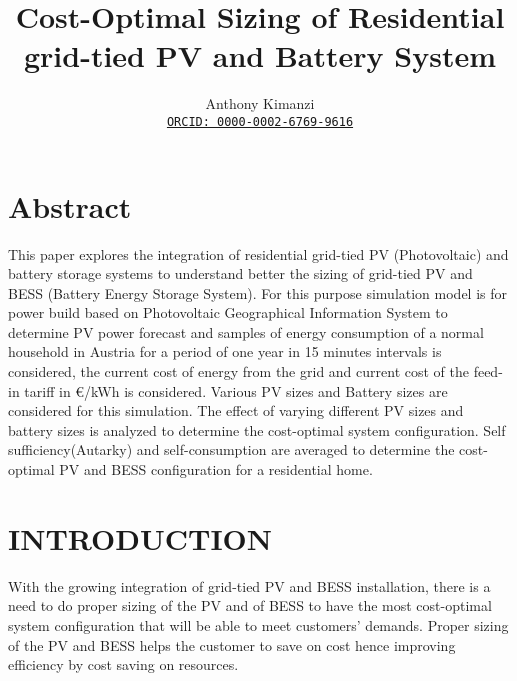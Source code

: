\documentclass[sigconf,12pt,nonacm]{acmart}
\newcommand{\myorcid}[1]{\href{https://orcid.org/#1}{\texttt{ORCID: #1}}}
\begin{document}
\title{Cost-Optimal Sizing of Residential  grid-tied PV and Battery System }


\author{Anthony Kimanzi\\\myorcid{0000-0002-6769-9616}}







\maketitle

\section{Abstract}
This paper explores the integration of residential grid-tied  PV (Photovoltaic) and battery storage systems to understand better the sizing of grid-tied PV and BESS (Battery Energy Storage System). For this purpose simulation model is for power build based on Photovoltaic Geographical Information System to determine PV  power forecast and samples of energy consumption of a normal household in Austria for a period of one year in 15 minutes intervals is considered, the current cost of energy from the grid and current cost of the feed-in tariff in €/kWh is considered. Various PV sizes and Battery sizes are considered for this simulation. The effect of varying different PV sizes and battery sizes is analyzed to determine the cost-optimal system configuration. Self sufficiency(Autarky) and self-consumption are averaged to determine the cost-optimal PV and BESS configuration for a residential home.
\section{INTRODUCTION}
With the growing integration of grid-tied PV and BESS  installation, there is a need to do proper sizing of the PV and of BESS to have the most cost-optimal system configuration that will be able to meet customers' demands. Proper sizing of the PV and BESS helps the customer to save on cost hence improving efficiency\cite{dorsey_2019_energy} by cost saving on resources.
\end{document}
